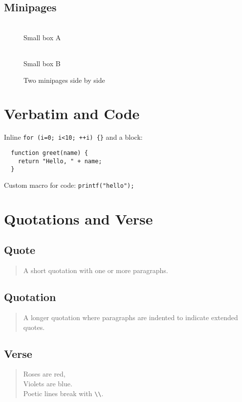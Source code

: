\documentclass[titlepage,a4paper,12pt]{article}
\newcommand{\code}[1]{\texttt{#1}} %
\begin{document}
\subsection{Minipages}
\begin{figure}[htbp]
  \centering
  \begin{minipage}[t]{0.45\linewidth}
    \centering
    \fbox{\rule{0pt}{1.5in}\rule{2in}{0pt}}\\
    Small box A
  \end{minipage}
  \hfill
  \begin{minipage}[t]{0.45\linewidth}
    \centering
    \fbox{\rule{0pt}{1.5in}\rule{2in}{0pt}}\\
    Small box B
  \end{minipage}
  \caption{Two minipages side by side}
  \label{fig:minipages}
\end{figure}

\section{Verbatim and Code}
Inline \verb|for (i=0; i<10; ++i) {}| and a block:
  \begin{verbatim}
  function greet(name) {
    return "Hello, " + name;
  }
  \end{verbatim}

Custom macro for code: \code{printf("hello");}

\section{Quotations and Verse}
\subsection{Quote}
\begin{quote}
  A short quotation with one or more paragraphs.
\end{quote}

\subsection{Quotation}
\begin{quotation}
  A longer quotation where paragraphs are indented to indicate extended quotes.
\end{quotation}

\subsection{Verse}
\begin{verse}
  Roses are red,\\
  Violets are blue.\\
  Poetic lines break with \verb|\\|.
\end{verse}
\end{document}
